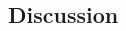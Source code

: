 \begin{CJK}{UTF8}{gbsn}
\section{Discussion}


















                                                          \end{CJK}

